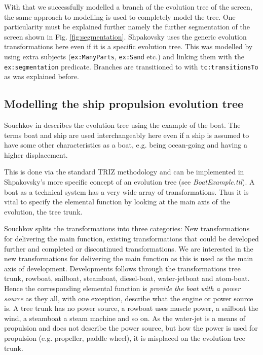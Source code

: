 \documentclass[11pt,a4paper]{article}
\begin{document}
With that we successfully modelled a branch of the evolution tree of the
screen, the same approach to modelling is used to completely model the tree.
One particularity must be explained further namely the further segmentation of
the screen shown in Fig. \ref{fig:segmentation}. Shpakovsky uses the generic
evolution transformations here even if it is a specific evolution tree. This
was modelled by using extra subjects (\texttt{ex:ManyParts}, \texttt{ex:Sand}
etc.) and linking them with the \texttt{ex:segmentation} predicate. Branches
are transitioned to with \texttt{tc:transitionsTo} as was explained before.


\subsection{Modelling the ship propulsion evolution tree}

Souchkov in \cite{KS} describes the evolution tree using the example of the
boat. The terms boat and ship are used interchangeably here even if a ship is
assumed to have some other characteristics as a boat, e.g. being ocean-going
and having a higher displacement. 

This is done via the standard TRIZ methodology and can be implemented in
Shpakovsky's more specific concept of an evolution tree (see
\textit{BoatExample.ttl}). A boat as a technical system has a very wide array
of transformations. Thus it is vital to specify the elemental function by
looking at the main axis of the evolution, the tree trunk.

Souchkov splits the transformations into three categories: New transformations
for delivering the main function, existing transformations that could be
developed further and completed or discontinued transformations. We are
interested in the new transformations for delivering the main function as this
is used as the main axis of development. Developments follows through the
transformations tree trunk, rowboat, sailboat, steamboat, diesel-boat,
water-jetboat and atom-boat. Hence the corresponding elemental function is
\textit{provide the boat with a power source} as they all, with one exception,
describe what the engine or power source is. A tree trunk has no power source,
a rowboat uses muscle power, a sailboat the wind, a steamboat a steam machine
and so on. As the water-jet is a means of propulsion and does not describe the
power source, but how the power is used for propulsion (e.g. propeller, paddle
wheel), it is misplaced on the evolution tree trunk.
\newpage
\end{document}
